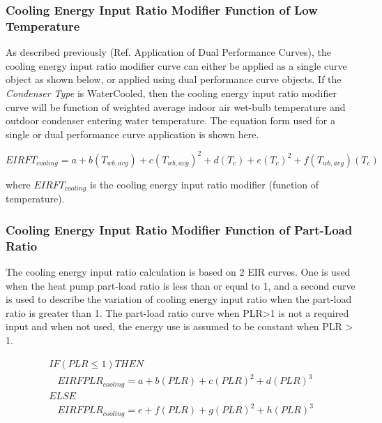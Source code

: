 \subsubsection{Cooling Energy Input Ratio Modifier Function of Low Temperature}\label{cooling-energy-input-ratio-modifier-function-of-low-temperature}

As described previously (Ref. Application of Dual Performance Curves), the cooling energy input ratio modifier curve can either be applied as a single curve object as shown below, or applied using dual performance curve objects. If the \textit{Condenser Type} is WaterCooled, then the cooling energy input ratio modifier curve will be function of weighted average indoor air wet-bulb temperature and outdoor condenser entering water temperature. The equation form used for a single or dual performance curve application is shown here.

\begin{equation}
  EIRFT_{cooling} = a + b \left( T_{wb,avg} \right) + c \left( T_{wb,avg} \right)^2 + d \left( T_c \right) + e \left( T_c \right)^2 + f \left( T_{wb,avg} \right) \left( T_c \right)
\end{equation}

where \(EIRFT_{cooling}\) is the cooling energy input ratio modifier (function of temperature).

\subsubsection{Cooling Energy Input Ratio Modifier Function of Part-Load Ratio}\label{cooling-energy-input-ratio-modifier-function-of-part-load-ratio}

The cooling energy input ratio calculation is based on 2 EIR curves. One is used when the heat pump part-load ratio is less than or equal to 1, and a second curve is used to describe the variation of cooling energy input ratio when the part-load ratio is greater than 1. The part-load ratio curve when PLR>1 is not a required input and when not used, the energy use is assumed to be constant when PLR > 1.

\begin{equation}
  \begin{array}{l}
  IF\left( {PLR \leq 1} \right)THEN \\
  ~~~~EIRFPLR_{cooling} = a + b \left( PLR \right) + c \left( PLR \right)^2 + d \left( PLR \right)^3 \\
  ELSE \\
  ~~~~EIRFPLR_{cooling} = e + f \left( PLR \right) + g \left( PLR \right)^2 + h \left( PLR \right)^3
  \end{array}
\end{equation}

